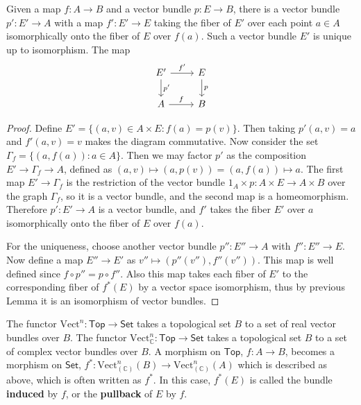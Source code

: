 \begin{prop} Given a map $f:A\rightarrow B$ and a vector bundle $p:E\rightarrow B$, there is a vector bundle $p':E'\rightarrow A$ with a map $f':E'\rightarrow E$ taking the fiber of $E'$ over each point $a\in A$ isomorphically onto the fiber of $E$ over $f(a)$. Such a vector bundle $E'$ is unique up to isomorphism. The map
\begin{equation}
\begin{tikzcd}
E'\arrow{r}{f'} \arrow{d}{p'}& E \arrow{d}{p}\\
A\arrow{r}{f}&B
\end{tikzcd}
\end{equation}
\end{prop}
\begin{proof} Define $E'=\{(a,v)\in A\times E:f(a)=p(v)\}$. Then taking $p'(a,v)=a$ and $f'(a,v)=v$ makes the diagram commutative. Now consider the set $\Gamma_f=\{(a,f(a)):a\in A\}$. Then we may factor $p'$ as the composition $E'\rightarrow \Gamma_f\rightarrow A$, defined as $(a,v)\mapsto (a,p(v))= (a,f(a))\mapsto a$. The first map $E'\rightarrow \Gamma_f$ is the restriction of the vector bundle $1_A\times p:A\times E\rightarrow A\times B$ over the graph $\Gamma_f$, so it is a vector bundle, and the second map is a homeomorphism. Therefore $p':E'\rightarrow A$ is a vector bundle, and $f'$ takes the fiber $E'$ over $a$ isomorphically onto the fiber of $E$ over $f(a)$.

For the uniqueness, choose another vector bundle $p'':E''\rightarrow A$ with $f'':E''\rightarrow E$. Now define a map $E''\rightarrow E'$ as $v''\mapsto (p''(v''),f''(v''))$. This map is well defined since $f\circ p''=p\circ f''$. Also this map takes each fiber of $E'$ to the corresponding fiber of $f^*(E)$ by a vector space isomorphism, thus by previous Lemma it is an isomorphism of vector bundles.
\end{proof}

\begin{defn} The functor $\textrm{Vect}^n:\mathsf{Top}\rightarrow \mathsf{Set}$ takes a topological set $B$ to a set of real vector bundles over $B$. The functor $\textrm{Vect}^n_\mathbb{C}:\mathsf{Top}\rightarrow \mathsf{Set}$ takes a topological set $B$ to a set of complex vector bundles over $B$. A morphism on $\mathsf{Top}$, $f:A\rightarrow B$, becomes a morphism on $\mathsf{Set}$, $f^*:\textrm{Vect}^n_{(\mathbb{C})}(B)\rightarrow \textrm{Vect}^n_{(\mathbb{C})}(A)$ which is described as above, which is often written as $f^*$. In this case, $f^*(E)$ is called the bundle \textbf{induced} by $f$, or the \textbf{pullback} of $E$ by $f$. 
\end{defn}

